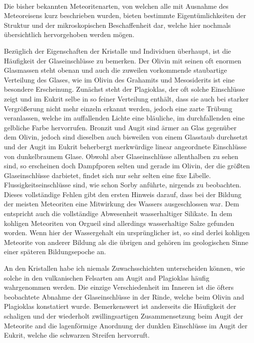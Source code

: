 \documentclass[a4paper, 12pt, oneside]{article}
\begin{document}
\paragraph*{}
Die bisher bekannten Meteoritenarten, von welchen alle mit Ausnahme des Meteoreisens kurz beschrieben wurden, bieten bestimmte Eigentümlichkeiten der Struktur und der mikroskopischen Beschaffenheit dar, welche hier nochmals übersichtlich hervorgehoben werden mögen.

Bezüglich der Eigenschaften der Kristalle und Individuen überhaupt, ist die Häufigkeit der Glaseinschlüsse zu bemerken. Der Olivin mit seinen oft enormen Glasmassen steht obenan und auch die zuweilen vorkommende staubartige Verteilung des Glases, wie im Olivin des Grahamits und Mesosiderits ist eine besondere Erscheinung. Zunächst steht der Plagioklas, der oft solche Einschlüsse zeigt und im Eukrit selbe in so feiner Verteilung enthält, dass sie auch bei starker Vergrößerung nicht mehr einzeln erkannt werden, jedoch eine zarte Trübung veranlassen, welche im auffallenden Lichte eine bläuliche, im durchfallenden eine gelbliche Farbe hervorrufen. Bronzit und Augit sind ärmer an Glas gegenüber dem Olivin, jedoch sind dieselben auch bisweilen von einem Glasstaub durchsetzt und der Augit im Eukrit beherbergt merkwürdige linear angeordnete Einschlüsse von dunkelbraunem Glase. Obwohl aber Glaseinschlüsse allenthalben zu sehen sind, so erscheinen doch Dampfporen selten und gerade im Olivin, der die größten Glaseinschlüsse darbietet, findet sich nur sehr selten eine fixe Libelle. Flussigkeitseinschlüsse sind, wie schon Sorby anführte, nirgends zu beobachten. Dieses vollständige Fehlen gibt den ersten Hinweis darauf, dass bei der Bildung der meisten Meteoriten eine Mitwirkung des Wassers ausgeschlossen war. Dem entspricht auch die vollständige Abwesenheit wasserhaltiger Silikate. In dem kohligen Meteoriten von Orgueil sind allerdings wasserhaltige Salze gefunden worden. Wenn hier der Wassergehalt ein ursprünglicher ist, so sind derlei kohligen Meteorite von anderer Bildung als die übrigen and gehören im geologischen Sinne einer späteren Bildungsepoche an.

An den Kristallen habe ich niemals Zuwachsschichten unterscheiden können, wie solche in den vulkanischen Felsarten am Augit and Plagioklas häufig wahrgenommen werden. Die einzige Verschiedenheit im Inneren ist die öfters beobachtete Abnahme der Glaseinschlüsse in der Rinde, welche beim Olivin and Plagioklas konstatiert wurde. Bemerkenswert ist anderseits die Häufigkeit der schaligen und der wiederholt zwillingsartigen Zusammensetzung beim Augit der Meteorite and die lagenförmige Anordnung der dunklen Einschlüsse im Augit der Eukrit, welche die schwarzen Streifen hervorruft.
\end{document}
